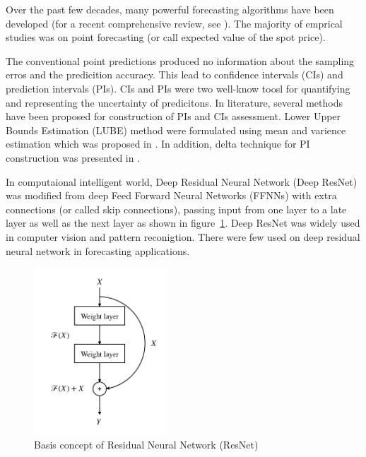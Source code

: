 \documentclass[review]{elsarticle}
\begin{document}
    Over the past few decades, many powerful forecasting algorithms have been developed (for a recent comprehensive review, see \cite{Weron2014}).
    The majority of emprical studies was on point forecasting (or call expected value of the spot price).

    The conventional point predictions produced no information about the sampling erros and the predicition accuracy.
    This lead to confidence intervals (CIs) and prediction intervals (PIs).
    CIs and PIs were two well-know toosl for quantifying and representing the uncertainty of predicitons.
    In literature, several methods have been proposed for construction of PIs and CIs assessment.
    Lower Upper Bounds Estimation (LUBE) method were formulated using mean and varience estimation which was proposed in \cite{Khosravi2011}.
    In addition, delta technique for PI construction was presented in \cite{KhosraviA2010}.

    In computaional intelligent world, Deep Residual Neural Network (Deep ResNet) was modified from deep Feed Forward Neural Networks (FFNNs) with extra connections (or called skip connections), passing input from one layer to a late layer as well as the next layer as shown in figure~\ref{Fig:Basic_DRNN}.
    Deep ResNet was widely used in computer vision and pattern reconigtion.
    There were few used on deep residual neural network in forecasting applications.

    \begin{figure}[H]
      \centering
      \includegraphics[width=5cm]{basic_DRNN}
      \caption{Basis concept of Residual Neural Network (ResNet)}
      \label{Fig:Basic_DRNN}
    \end{figure}
\end{document}
